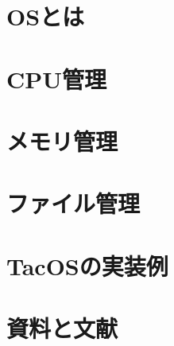 \documentclass[a4paper,11pt,twocolumn]{ltjsbook}     %
\begin{document}
\mainmatter

\part{OSとは}

\part{CPU管理}

\part{メモリ管理}
\label{memoryManagement}

\part{ファイル管理}

\part{TacOSの実装例}

\part{資料と文献}
\appendix
\end{document}
